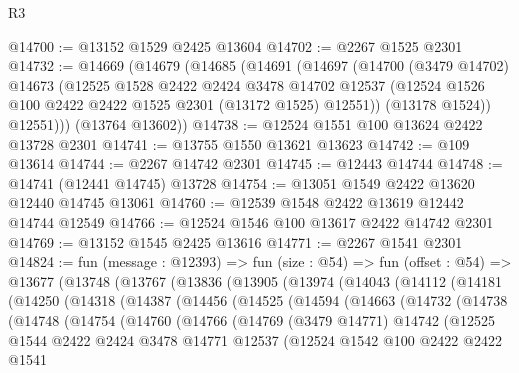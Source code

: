 \begin{lexlean}{R3}
\begin{coremodule}
@14700 := @13152 @1529 @2425 @13604
@14702 := @2267 @1525 @2301
@14732 := @14669
    (@14679
      (@14685
        (@14691
          (@14697
            (@14700
              (@3479 @14702)
              @14673
              (@12525
                @1528
                @2422
                @2424
                @3478
                @14702
                @12537
                (@12524 @1526 @100 @2422 @2422 @1525 @2301 (@13172 @1525) @12551))
              (@13178 @1524))
            @12551)))
      (@13764 @13602))
@14738 := @12524 @1551 @100 @13624 @2422 @13728 @2301
@14741 := @13755 @1550 @13621 @13623
@14742 := @109 @13614
@14744 := @2267 @14742 @2301
@14745 := @12443 @14744
@14748 := @14741 (@12441 @14745) @13728
@14754 := @13051 @1549 @2422 @13620 @12440 @14745 @13061
@14760 := @12539 @1548 @2422 @13619 @12442 @14744 @12549
@14766 := @12524 @1546 @100 @13617 @2422 @14742 @2301
@14769 := @13152 @1545 @2425 @13616
@14771 := @2267 @1541 @2301
@14824 := fun (message : @12393) =>
  fun (size : @54) =>
  fun (offset : @54) =>
  @13677
    (@13748
      (@13767
        (@13836
          (@13905
            (@13974
              (@14043
                (@14112
                  (@14181
                    (@14250
                      (@14318
                        (@14387
                          (@14456
                            (@14525
                              (@14594
                                (@14663
                                  (@14732
                                    (@14738
                                      (@14748
                                        (@14754
                                          (@14760
                                            (@14766
                                              (@14769
                                                (@3479 @14771)
                                                @14742
                                                (@12525
                                                  @1544
                                                  @2422
                                                  @2424
                                                  @3478
                                                  @14771
                                                  @12537
                                                  (@12524
                                                    @1542
                                                    @100
                                                    @2422
                                                    @2422
                                                    @1541

\end{coremodule}
\end{lexlean}
